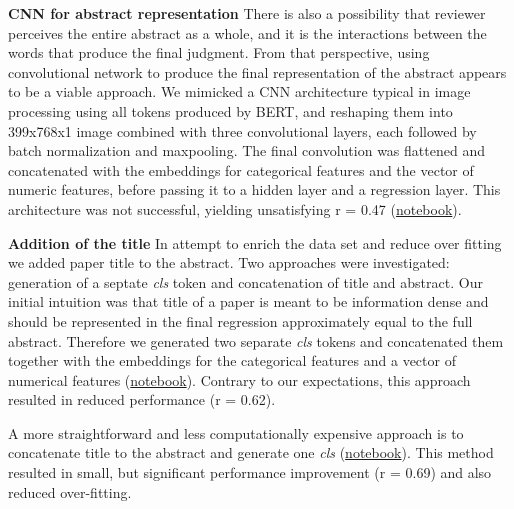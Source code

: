 \documentclass[11pt]{article}
\begin{document}
\textbf{CNN for abstract representation} There is also a possibility that reviewer perceives the entire abstract as a whole, and it is the interactions between the words that produce the final judgment. From that perspective, using convolutional network to produce the final representation of the abstract appears to be a viable approach. We mimicked a CNN architecture typical in image processing using all tokens produced by BERT, and reshaping them into 399x768x1 image combined with three convolutional layers, each followed by batch normalization and maxpooling. The final convolution was flattened and concatenated with the embeddings for categorical features and the vector of numeric features, before passing it to a hidden layer and a regression layer. This architecture was not successful, yielding unsatisfying r = 0.47 (\href{https://github.com/ArtemChemist/w266_project/blob/main/Notebooks/sciBERT%20w%20small%20meta%20and%20CNN%20on%20tokens.ipynb}{notebook}).    

\textbf{Addition of the title} In attempt to enrich the data set and reduce over fitting we added paper title to the abstract. Two approaches were investigated: generation of a septate \textit{cls}  token and concatenation of title and abstract. Our initial intuition was that title of a paper is meant to be information dense and should be represented in the final regression approximately equal to the full abstract. Therefore we generated two separate \textit{cls} tokens and concatenated them together with the embeddings for the categorical features and a vector of numerical features (\href{https://github.com/ArtemChemist/w266_project/blob/main/Notebooks/sciBERT%20%2B%20sciBERT%20%2B%20small%20meta.ipynb}{notebook}). Contrary to our expectations, this approach resulted in reduced performance (r = 0.62).

A more straightforward and less computationally expensive approach is to concatenate title to the abstract and generate one \textit{cls} (\href{https://github.com/ArtemChemist/w266_project/blob/main/Notebooks/sciBERT%20w%20tit%2Babs.ipynb}{notebook}). This method resulted in small, but significant performance improvement (r = 0.69) and also reduced over-fitting.
\end{document}
